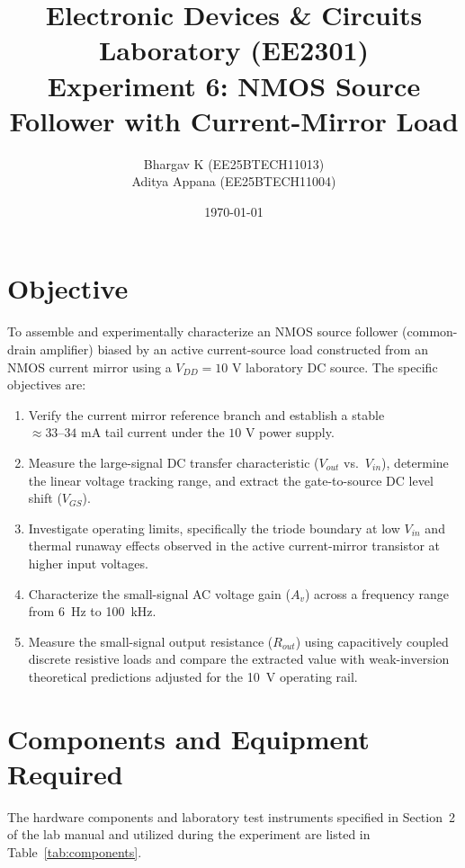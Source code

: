 \documentclass[11pt, a4paper]{article}
\title{\textbf{Electronic Devices \& Circuits Laboratory (EE2301)} \\
\Large Experiment 6: NMOS Source Follower with Current-Mirror Load}
\author{Bhargav K (EE25BTECH11013) \\ Aditya Appana (EE25BTECH11004)}
\date{\today}
\begin{document}
\maketitle

\section{Objective}
To assemble and experimentally characterize an NMOS source follower (common-drain amplifier) biased by an active current-source load constructed from an NMOS current mirror using a $V_{DD} = 10\text{ V}$ laboratory DC source. The specific objectives are:
\begin{enumerate}
    \item Verify the current mirror reference branch and establish a stable $\approx 33\text{--}34\text{ mA}$ tail current under the $10\text{ V}$ power supply.
    \item Measure the large-signal DC transfer characteristic ($V_{out}$ vs.\ $V_{in}$), determine the linear voltage tracking range, and extract the gate-to-source DC level shift ($V_{GS}$).
    \item Investigate operating limits, specifically the triode boundary at low $V_{in}$ and thermal runaway effects observed in the active current-mirror transistor at higher input voltages.
    \item Characterize the small-signal AC voltage gain ($A_v$) across a frequency range from 6~Hz to 100~kHz.
    \item Measure the small-signal output resistance ($R_{out}$) using capacitively coupled discrete resistive loads and compare the extracted value with weak-inversion theoretical predictions adjusted for the 10~V operating rail.
\end{enumerate}

\section{Components and Equipment Required}
The hardware components and laboratory test instruments specified in Section~2 of the lab manual and utilized during the experiment are listed in Table~\ref{tab:components}.
\end{document}
